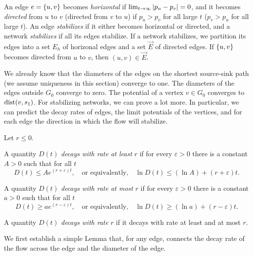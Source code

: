 \documentclass[11pt,a4paper]{article}
\renewcommand{\sink}{\ensuremath{s_1}}
\newcommand{\Eorient}{\overrightarrow{E}} \newcommand{\CB}{\mathit{F}}
\begin{document}
An edge $e = \{ u,v \}$ becomes \emph{horizontal} if $\lim_{t \to \infty} | p_u - p_v | =
0$, and it becomes \emph{directed} from $u$ to $v$ (directed from $v$ to $u$)
if $p_u > p_v$ for all large $t$ ($p_v > p_u$ for all large $t$). An edge
\emph{stabilizes} if it either becomes horizontal or directed, and a network
\emph{stabilizes} if all its edges stabilize. If a network stabilizes, we
partition its edges into a set $E_h$ of horizonal edges and a set $\Eorient$ of
directed edges. If $\{ u,v \}$ becomes directed from $u$ to $v$, then 
$(u,v) \in \Eorient$. 

We already know that the diameters of the edges on the
shortest source-sink path (we assume uniqueness in this section) converge to one. The diameters of the
edges outside $G_0$ converge to zero. The potential of a vertex $v \in G_0$
converges to $\dist(v,\sink)$. For stabilizing networks, we can prove a
lot more. In particular, we can predict the decay rates of edges, the limit
potentials of the vertices, and for each edge the
direction in which the flow will stabilize. 


\begin{definition} Let $r \le 0$. 

A quantity $D(t)$ \emph{decays with rate at least}
$r$ if for every $\varepsilon > 0$ there is a constant $A > 0$ such that for
all $t$
\[         D(t) \le A e^{(r + \varepsilon) t}, \quad\text{or equivalently,}\quad \ln D(t) \le (\ln
A) + (r + \varepsilon) t.\]

A quantity $D(t)$ \emph{decays with rate at most} $r$ if for every
$\varepsilon > 0$ there is a constant $a > 0$
such that for all $t$
\[ D(t) \ge a e^{(r - \varepsilon) t}, \quad\text{or equivalently,}\quad \ln D(t) \ge  (\ln
a) + (r - \varepsilon) t.\]

A quantity $D(t)$ \emph{decays with rate} $r$ if it decays with rate at least and at
most $r$. 
\end{definition}

We first establish a simple Lemma that, for any edge, connects the decay rate
of the flow across the edge and the diameter of the edge. 
\end{document}
